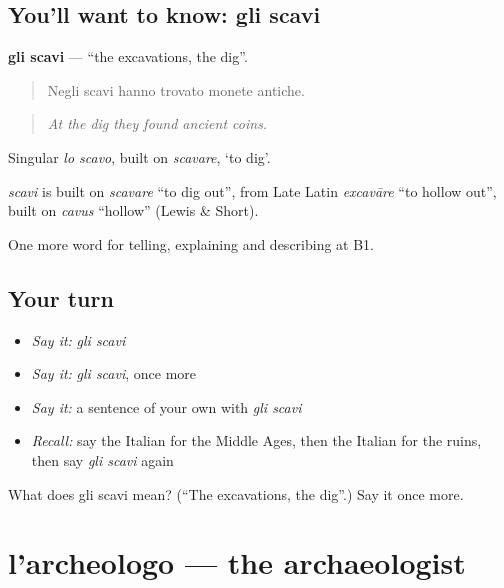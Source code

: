 \subsection*{You'll want to know: gli scavi}
\textbf{gli scavi} — \textquotedblleft{}the excavations, the dig\textquotedblright{}.

\begin{quote}
Negli scavi hanno trovato monete antiche.
\end{quote}

\begin{quote}
\emph{At the dig they found ancient coins.}
\end{quote}

Singular \emph{lo scavo}, built on \emph{scavare}, ‘to dig’.

\begin{cousinweb}
\emph{scavi} is built on \emph{scavare} \textquotedblleft{}to dig out\textquotedblright{}, from Late Latin \emph{excavāre} \textquotedblleft{}to hollow out\textquotedblright{}, built on \emph{cavus} \textquotedblleft{}hollow\textquotedblright{} (Lewis \& Short).
\end{cousinweb}

\begin{grammarlens}[title={What you've built}]
One more word for telling, explaining and describing at B1.
\end{grammarlens}

\subsection*{Your turn}
\begin{itemize}
\raggedright
  \item \emph{Say it:} \emph{gli scavi}
  \item \emph{Say it:} \emph{gli scavi}, once more
  \item \emph{Say it:} a sentence of your own with \emph{gli scavi}
  \item \emph{Recall:} say the Italian for the Middle Ages, then the Italian for the ruins, then say \emph{gli scavi} again
\end{itemize}

\begin{tcolorbox}[breakable,colback=teal!4,colframe=teal!35!black,title={Before you move on}]
What does gli scavi mean? (\textquotedblleft{}The excavations, the dig\textquotedblright{}.) Say it once more.
\end{tcolorbox}
\section[l'archeologo]{l'archeologo — the archaeologist}

